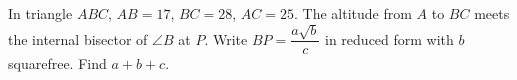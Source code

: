 In triangle $ABC$, $AB=17$, $BC=28$, $AC=25$. The altitude from $A$ to $BC$ meets the internal bisector of $\angle B$ at $P$. Write $BP=\dfrac{a\sqrt b}{c}$ in reduced form with $b$ squarefree. Find $a+b+c$.
